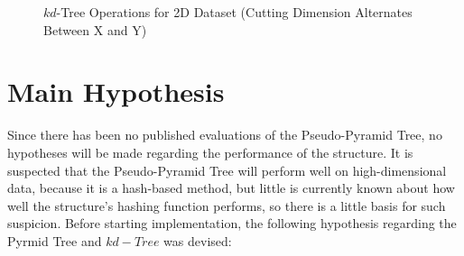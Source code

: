 \begin{figure}
	\begin{center}
	\end{center}

	\caption{$kd$-Tree Operations for 2D Dataset (Cutting Dimension Alternates Between X and Y)}
	\label{fig:kd-tree}
\end{figure}

\section{Main Hypothesis}
\label{sec:main-hypothesis}

Since there has been no published evaluations of the Pseudo-Pyramid Tree, no hypotheses will be made regarding the performance of the structure. It is suspected that the Pseudo-Pyramid Tree will perform well on high-dimensional data, because it is a hash-based method, but little is currently known about how well the structure's hashing function performs, so there is a little basis for such suspicion. Before starting implementation, the following hypothesis regarding the Pyrmid Tree and $kd-Tree$ was devised:

